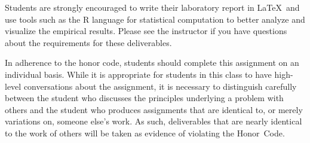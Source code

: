 Students are strongly encouraged to write their laboratory report in \LaTeX~and use tools such as the R language for
statistical computation to better analyze and visualize the empirical results. Please see the instructor if you have
questions about the requirements for these deliverables.

In adherence to the honor code, students should complete this assignment on an individual basis. While it is appropriate
for students in this class to have high-level conversations about the assignment, it is necessary to distinguish
carefully between the student who discusses the principles underlying a problem with others and the student who produces
assignments that are identical to, or merely variations on, someone else's work.  As such, deliverables that are nearly
identical to the work of others will be taken as evidence of violating the \mbox{Honor Code}.  



  
